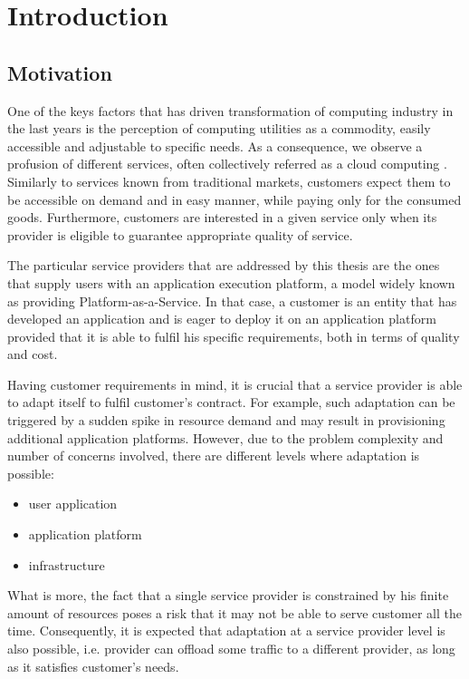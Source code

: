 \chapter{Introduction}

\section{Motivation}
One of the keys factors that has driven transformation of computing industry in the last years is the perception of computing utilities as a commodity\cite{BuYeVeBrBr09}, easily accessible and adjustable to specific needs. As a consequence, we observe a profusion of different services, often collectively referred as a cloud computing \cite{MeGr11}. Similarly to services known from traditional markets, customers expect them to be accessible on demand and in easy manner, while paying only for the consumed goods. Furthermore, customers are interested in a given service only when its provider is eligible to guarantee appropriate quality of service.

The particular service providers that are addressed by this thesis are the ones that supply users with an application execution platform, a model widely known as providing Platform-as-a-Service. In that case, a customer is an entity that has developed an application and is eager to deploy it on an application platform provided that it is able to fulfil his specific requirements, both in terms of quality and cost.

Having customer requirements in mind, it is crucial that a service provider is able to adapt itself to fulfil customer's contract. For example, such adaptation can be triggered by a sudden spike in resource demand and may result in provisioning additional application platforms. However, due to the problem complexity and number of concerns involved, there are different levels where adaptation is possible:
\begin{itemize}
	\item user application
	\item application platform
	\item infrastructure
\end{itemize}
What is more, the fact that a single service provider is constrained by his finite amount of resources poses a risk that it may not be able to serve customer all the time. Consequently, it is expected that adaptation at a service provider level is also possible, i.e. provider can offload some traffic to a different provider, as long as it satisfies customer's needs.

